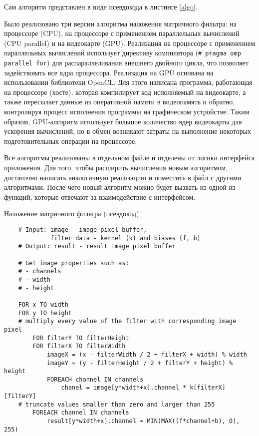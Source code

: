 Сам алгоритм представлен в виде псевдокода в листинге \ref{algo}.

Было реализовано три версии алгоритма наложения матричного фильтра: на процессоре (CPU), на процессоре с применением параллельных 
вычислений (CPU parallel) и на видеокарте (GPU). Реализация на процессоре с применением параллельных вычислений использует директиву 
компилятора (\verb!# pragma omp parallel for!) для распараллеливания внешнего двойного цикла, что позволяет задействовать все ядра процессора. 
Реализация на GPU основана на использовании библиотеки OpenCL. Для этого написана программа, работающая на процессоре (хосте), 
которая компилирует код исполняемый на видеокарте, а также пересылает данные из оперативной памяти в видеопамять и обратно, контролируя 
процесс исполнения программы на графическом устройстве. Таким образом, GPU-алгоритм использует большое количество ядер видеокарты для 
ускорения вычислений, но в обмен возникают затраты на выполнение некоторых подготовительных операции на процессоре.

Все алгоритмы реализованы в отдельном файле и отделены от логики интерфейса приложения. Для того, чтобы расширить вычисления новым 
алгоритмом, достаточно написать аналогичную реализацию и поместить в файл с другими алгоритмами. После чего новый алгоритм можно будет 
вызвать из одной из функций, которые отвечают за взаимодействие с интерфейсом.


\begin{minipage}{0.95\textwidth}
\begin{algorithm}[H]
    \centering
    \caption{Наложение матричного фильтра (псевдокод)}\label{algo}
    \begin{verbatim}
    # Input: image - image pixel buffer,
             filter data - kernel (k) and biases (f, b)
    # Output: result - result image pixel buffer
    
    # Get image properties such as:
    # - channels
    # - width
    # - height
    
    FOR x TO width
    FOR y TO height
    # multiply every value of the filter with corresponding image pixel
        FOR filterY TO filterHeight
        FOR filterX TO filterWidth
            imageX = (x - filterWidth / 2 + filterX + width) % width
            imageY = (y - filterHeight / 2 + filterY + height) % height
            FOREACH channel IN channels
                chanel = image[y*width+x].channel * k[filterX][filterY]
    # truncate values smaller than zero and larger than 255
        FOREACH channel IN channels
            result[y*width+x].channel = MIN(MAX((f*channel+b), 0), 255)
    \end{verbatim}
\end{algorithm}
\end{minipage}\hfill

\pagebreak